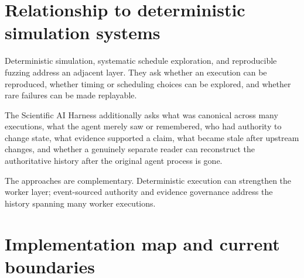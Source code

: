 \section{Relationship to deterministic simulation systems}

Deterministic simulation, systematic schedule exploration, and reproducible fuzzing address an adjacent layer. They ask whether an execution can be reproduced, whether timing or scheduling choices can be explored, and whether rare failures can be made replayable.

The Scientific AI Harness additionally asks what was canonical across many executions, what the agent merely saw or remembered, who had authority to change state, what evidence supported a claim, what became stale after upstream changes, and whether a genuinely separate reader can reconstruct the authoritative history after the original agent process is gone.

The approaches are complementary. Deterministic execution can strengthen the worker layer; event-sourced authority and evidence governance address the history spanning many worker executions.

\section{Implementation map and current boundaries}

